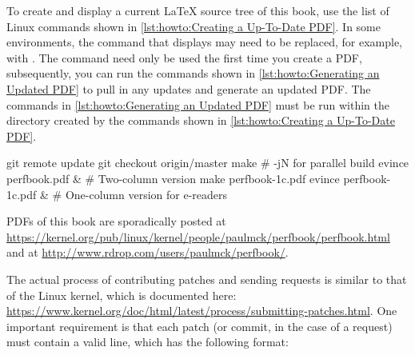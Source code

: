 \begin{listing}
\caption{Creating an Up-To-Date PDF}
\label{lst:howto:Creating a Up-To-Date PDF}
\end{listing}

To create and display a current \LaTeX{} source tree of this book,
use the list of Linux commands shown in
\cref{lst:howto:Creating a Up-To-Date PDF}.
In some environments, the  command that displays 
may need to be replaced, for example, with .
The  command need only be used the first time you
create a PDF, subsequently, you can run the commands shown in
\cref{lst:howto:Generating an Updated PDF} to pull in any updates
and generate an updated PDF\@.
The commands in
\cref{lst:howto:Generating an Updated PDF}
must be run within the  directory created by the commands
shown in
\cref{lst:howto:Creating a Up-To-Date PDF}.

\begin{listing}
\begin{VerbatimL}[numbers=none,xleftmargin=0pt]
git remote update
git checkout origin/master
make                     # -jN for parallel build
evince perfbook.pdf &    # Two-column version
make perfbook-1c.pdf
evince perfbook-1c.pdf & # One-column version for e-readers
\end{VerbatimL}
\caption{Generating an Updated PDF}
\label{lst:howto:Generating an Updated PDF}
\end{listing}

PDFs of this book are sporadically posted at
\url{https://kernel.org/pub/linux/kernel/people/paulmck/perfbook/perfbook.html}
and at
\url{http://www.rdrop.com/users/paulmck/perfbook/}.

The actual process of contributing patches and sending 
requests is similar to that of the Linux kernel, which is documented
here:
\url{https://www.kernel.org/doc/html/latest/process/submitting-patches.html}.
One important requirement is that each patch (or commit, in the case
of a  request) must contain a valid  line,
which has the following format:

